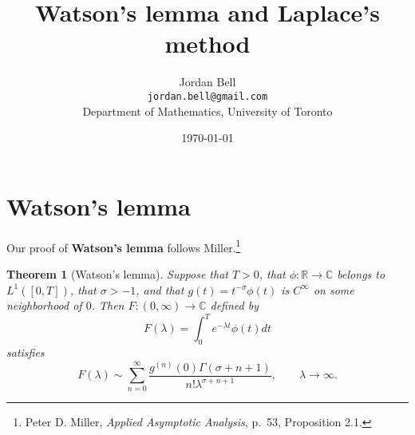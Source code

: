 \documentclass{article}
\newtheorem{theorem}{Theorem}
\theoremstyle{definition}
\begin{document}
\title{Watson's lemma and Laplace's method}
\author{Jordan Bell\\ \texttt{jordan.bell@gmail.com}\\Department of Mathematics, University of Toronto}
\date{\today}

\maketitle


\section{Watson's lemma}
Our proof of \textbf{Watson's lemma} follows Miller.\footnote{Peter D. Miller, {\em Applied Asymptotic Analysis}, p.~53, Proposition 2.1.}

\begin{theorem}[Watson's lemma]
Suppose that $T>0$, that $\phi:\mathbb{R} \to \mathbb{C}$ belongs to 
$L^1([0,T])$, 
that $\sigma>-1$, and that  $g(t)=t^{-\sigma} \phi(t)$ is $C^\infty$ on some neighborhood of $0$.
Then $F:(0,\infty) \to \mathbb{C}$ defined by
\[
F(\lambda) = \int_0^T e^{-\lambda t} \phi(t) dt
\]
satisfies
\[
F(\lambda) \sim \sum_{n =0}^\infty \frac{g^{(n)}(0) \Gamma(\sigma+n+1)}{n! \lambda^{\sigma+n+1}}, \qquad \lambda \to \infty.
\]
\end{theorem}
\end{document}

